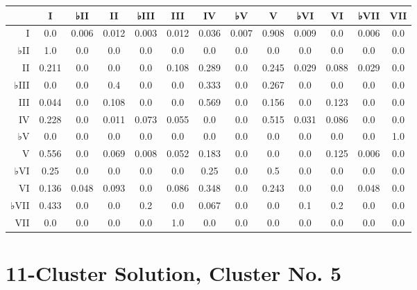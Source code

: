 \begin{table}[htbp]
\begin{minipage}{\linewidth}
\setlength{\tymax}{0.5\linewidth}
\centering
\small
\begin{tabulary}{\textwidth}{@{}RCCCCCCCCCCCC@{}} \toprule
&I&♭II&II&♭III&III&IV&♭V&V&♭VI&VI&♭VII&VII\\
\midrule
I&0.0&0.006&0.012&0.003&0.012&0.036&0.007&0.908&0.009&0.0&0.006&0.0\\
♭II&1.0&0.0&0.0&0.0&0.0&0.0&0.0&0.0&0.0&0.0&0.0&0.0\\
II&0.211&0.0&0.0&0.0&0.108&0.289&0.0&0.245&0.029&0.088&0.029&0.0\\
♭III&0.0&0.0&0.4&0.0&0.0&0.333&0.0&0.267&0.0&0.0&0.0&0.0\\
III&0.044&0.0&0.108&0.0&0.0&0.569&0.0&0.156&0.0&0.123&0.0&0.0\\
IV&0.228&0.0&0.011&0.073&0.055&0.0&0.0&0.515&0.031&0.086&0.0&0.0\\
♭V&0.0&0.0&0.0&0.0&0.0&0.0&0.0&0.0&0.0&0.0&0.0&1.0\\
V&0.556&0.0&0.069&0.008&0.052&0.183&0.0&0.0&0.0&0.125&0.006&0.0\\
♭VI&0.25&0.0&0.0&0.0&0.0&0.25&0.0&0.5&0.0&0.0&0.0&0.0\\
VI&0.136&0.048&0.093&0.0&0.086&0.348&0.0&0.243&0.0&0.0&0.048&0.0\\
♭VII&0.433&0.0&0.0&0.2&0.0&0.067&0.0&0.0&0.1&0.2&0.0&0.0\\
VII&0.0&0.0&0.0&0.0&1.0&0.0&0.0&0.0&0.0&0.0&0.0&0.0\\

\bottomrule

\end{tabulary}
\end{minipage}
\end{table}

\section{11-Cluster Solution, Cluster No. 5}
\label{11-clustersolutionclusterno.5}

